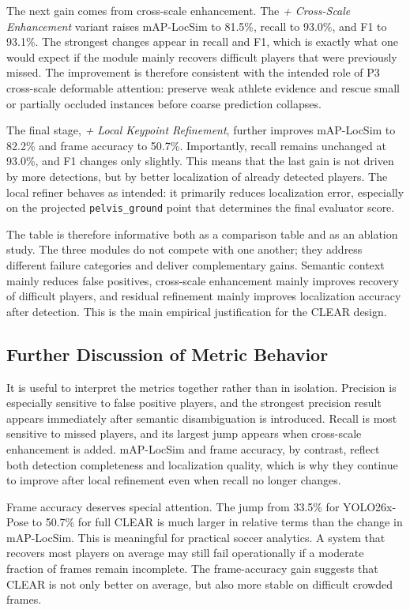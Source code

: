 \documentclass[runningheads]{llncs}
\begin{document}
The next gain comes from cross-scale enhancement. The \emph{+ Cross-Scale Enhancement} variant raises mAP-LocSim to 81.5\%, recall to 93.0\%, and F1 to 93.1\%. The strongest changes appear in recall and F1, which is exactly what one would expect if the module mainly recovers difficult players that were previously missed. The improvement is therefore consistent with the intended role of P3 cross-scale deformable attention: preserve weak athlete evidence and rescue small or partially occluded instances before coarse prediction collapses.

The final stage, \emph{+ Local Keypoint Refinement}, further improves mAP-LocSim to 82.2\% and frame accuracy to 50.7\%. Importantly, recall remains unchanged at 93.0\%, and F1 changes only slightly. This means that the last gain is not driven by more detections, but by better localization of already detected players. The local refiner behaves as intended: it primarily reduces localization error, especially on the projected \texttt{pelvis\_ground} point that determines the final evaluator score.

The table is therefore informative both as a comparison table and as an ablation study. The three modules do not compete with one another; they address different failure categories and deliver complementary gains. Semantic context mainly reduces false positives, cross-scale enhancement mainly improves recovery of difficult players, and residual refinement mainly improves localization accuracy after detection. This is the main empirical justification for the CLEAR design.

\subsection{Further Discussion of Metric Behavior}
\label{sec:metric-discussion}

It is useful to interpret the metrics together rather than in isolation. Precision is especially sensitive to false positive players, and the strongest precision result appears immediately after semantic disambiguation is introduced. Recall is most sensitive to missed players, and its largest jump appears when cross-scale enhancement is added. mAP-LocSim and frame accuracy, by contrast, reflect both detection completeness and localization quality, which is why they continue to improve after local refinement even when recall no longer changes.

Frame accuracy deserves special attention. The jump from 33.5\% for YOLO26x-Pose to 50.7\% for full CLEAR is much larger in relative terms than the change in mAP-LocSim. This is meaningful for practical soccer analytics. A system that recovers most players on average may still fail operationally if a moderate fraction of frames remain incomplete. The frame-accuracy gain suggests that CLEAR is not only better on average, but also more stable on difficult crowded frames.
\end{document}
